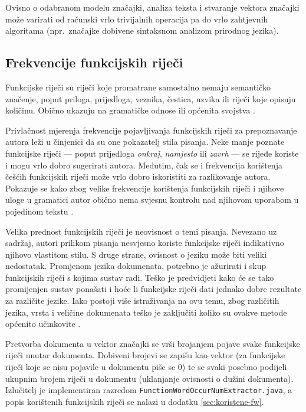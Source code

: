 \documentclass{article}
\begin{document}
Ovisno o odabranom modelu značajki, analiza teksta i stvaranje vektora značajki
može varirati od računski vrlo trivijalnih operacija pa do vrlo zahtjevnih
algoritama (npr.~značajke dobivene sintaksnom analizom prirodnog jezika).


\subsection{Frekvencije funkcijskih riječi}
\label{sec:funkcijske-rijeci}
Funkcijske riječi su riječi koje promatrane samostalno nemaju semantičko
značenje, poput priloga, prijedloga, veznika, čestica, uzvika ili riječi koje
opisuju količinu. Obično ukazuju na gramatičke odnose ili općenita svojstva
\citep{zhao2005effective}.

Privlačnost mjerenja frekvencije pojavljivanja funkcijskih riječi za
prepoznavanje autora leži u činjenici da su one pokazatelj stila pisanja. Neke
manje poznate funkcijske riječi --- poput prijedloga \emph{onkraj},
\emph{namjesto} ili \emph{zavrh} --- se rijeđe koriste i mogu vrlo dobro
sugerirati autora. Međutim, čak se i frekvencija korištenja češćih funkcijskih
riječi može vrlo dobro iskoristiti za razlikovanje autora. Pokazuje se kako zbog
velike frekvencije korištenja funkcijskih riječi i njihove uloge u gramatici
autor obično nema svjesnu kontrolu nad njihovom uporabom u pojedinom tekstu
\citep{argamon2005measuring}.

Velika prednost funkcijskih riječi je neovisnost o temi pisanja. Nevezano uz
sadržaj, autori prilikom pisanja nesvjesno koriste funkcijske riječi indikativno
njihovo vlastitom stilu. S druge strane, ovisnost o jeziku može biti veliki
nedostatak. Promjenom jezika dokumenata, potrebno je ažurirati i skup funkcijskih
riječi s kojima sustav radi. Teško je predvidjeti kako će se tako promijenjen
sustav ponašati i hoće li funkcijske riječi dati jednako dobre rezultate za
različite jezike. Iako postoji više istraživanja na ovu temu, zbog različitih
jezika, vrsta i veličine dokumenata teško je zaključiti koliko su ovakve metode
općenito učinkovite \citep{zhao2005effective}.

Pretvorba dokumenta u vektor značajki se vrši brojanjem pojave svake funkcijske
riječi unutar dokumenta. Dobiveni brojevi se zapišu kao vektor (za funkcijske
riječi koje se nisu pojavile u dokumentu piše se 0) te se svaki posebno podijeli
ukupnim brojem riječi u dokumentu (uklanjanje ovisnosti o dužini dokumenta).
Izlučitelj je implementiran razredom \texttt{FunctionWordOccurNumExtractor.java},
a popis korištenih funkcijskih riječi se nalazi u dodatku \ref{sec:koristene-fw}.
\end{document}
